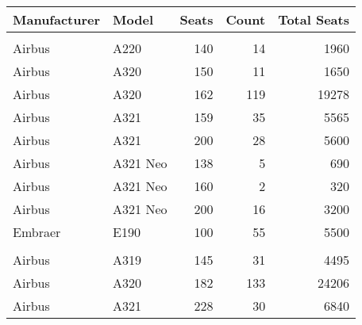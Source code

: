 \begin{tabular}[t]{llrrr}
\toprule
Manufacturer & Model & Seats & Count & Total Seats\\
\midrule
\addlinespace[0.3em]
\multicolumn{5}{l}{\textbf{JetBlue}}\\
\hspace{1em}Airbus & A220 & 140 & 14 & 1960\\
\hspace{1em}Airbus & A320 & 150 & 11 & 1650\\
\hspace{1em}Airbus & A320 & 162 & 119 & 19278\\
\hspace{1em}Airbus & A321 & 159 & 35 & 5565\\
\hspace{1em}Airbus & A321 & 200 & 28 & 5600\\
\hspace{1em}Airbus & A321 Neo & 138 & 5 & 690\\
\hspace{1em}Airbus & A321 Neo & 160 & 2 & 320\\
\hspace{1em}Airbus & A321 Neo & 200 & 16 & 3200\\
\hspace{1em}Embraer & E190 & 100 & 55 & 5500\\
\addlinespace[0.3em]
\multicolumn{5}{l}{\textbf{Spirit}}\\
\hspace{1em}Airbus & A319 & 145 & 31 & 4495\\
\hspace{1em}Airbus & A320 & 182 & 133 & 24206\\
\hspace{1em}Airbus & A321 & 228 & 30 & 6840\\
\bottomrule
\end{tabular}
